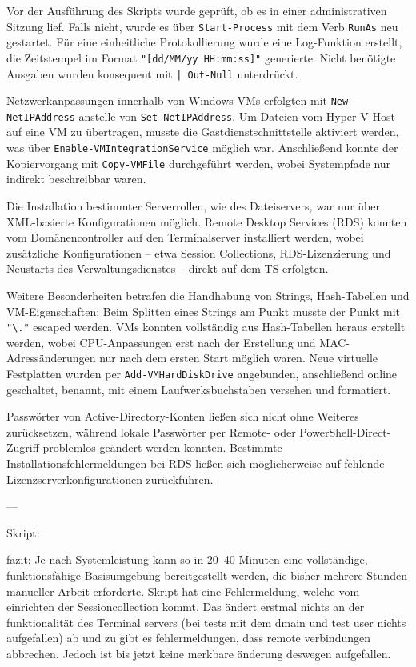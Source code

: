 \documentclass[conference]{IEEEtran}
\begin{document}
Vor der Ausführung des Skripts wurde geprüft, ob es in einer administrativen Sitzung lief. Falls nicht, wurde es über \texttt{Start-Process} mit dem Verb \texttt{RunAs} neu gestartet. Für eine einheitliche Protokollierung wurde eine Log-Funktion erstellt, die Zeitstempel im Format \texttt{"[dd/MM/yy HH:mm:ss]"} generierte. Nicht benötigte Ausgaben wurden konsequent mit \texttt{| Out-Null} unterdrückt.  

Netzwerkanpassungen innerhalb von Windows-VMs erfolgten mit \texttt{New-NetIPAddress} anstelle von \texttt{Set-NetIPAddress}. Um Dateien vom Hyper-V-Host auf eine VM zu übertragen, musste die Gastdienstschnittstelle aktiviert werden, was über \texttt{Enable-VMIntegrationService} möglich war. Anschließend konnte der Kopiervorgang mit \texttt{Copy-VMFile} durchgeführt werden, wobei Systempfade nur indirekt beschreibbar waren.  

Die Installation bestimmter Serverrollen, wie des Dateiservers, war nur über XML-basierte Konfigurationen möglich. Remote Desktop Services (RDS) konnten vom Domänencontroller auf den Terminalserver installiert werden, wobei zusätzliche Konfigurationen -- etwa Session Collections, RDS-Lizenzierung und Neustarts des Verwaltungsdienstes -- direkt auf dem TS erfolgten.  

Weitere Besonderheiten betrafen die Handhabung von Strings, Hash-Tabellen und VM-Eigenschaften: Beim Splitten eines Strings am Punkt musste der Punkt mit \texttt{"\textbackslash."} escaped werden. VMs konnten vollständig aus Hash-Tabellen heraus erstellt werden, wobei CPU-Anpassungen erst nach der Erstellung und MAC-Adressänderungen nur nach dem ersten Start möglich waren. Neue virtuelle Festplatten wurden per \texttt{Add-VMHardDiskDrive} angebunden, anschließend online geschaltet, benannt, mit einem Laufwerksbuchstaben versehen und formatiert.  

Passwörter von Active-Directory-Konten ließen sich nicht ohne Weiteres zurücksetzen, während lokale Passwörter per Remote- oder PowerShell-Direct-Zugriff problemlos geändert werden konnten. Bestimmte Installationsfehlermeldungen bei RDS ließen sich möglicherweise auf fehlende Lizenzserverkonfigurationen zurückführen.

---

Skript:


fazit:
Je nach Systemleistung kann so in 20--40 Minuten eine vollständige, funktionsfähige Basisumgebung bereitgestellt werden, die bisher mehrere Stunden manueller Arbeit erforderte.
Skript hat eine Fehlermeldung, welche vom einrichten der Sessioncollection kommt. Das ändert erstmal nichts an der funktionalität des Terminal servers (bei tests mit dem dmain und test user nichts aufgefallen)
ab und zu gibt es fehlermeldungen, dass remote verbindungen abbrechen. Jedoch ist bis jetzt keine merkbare änderung deswegen aufgefallen.
\end{document}
